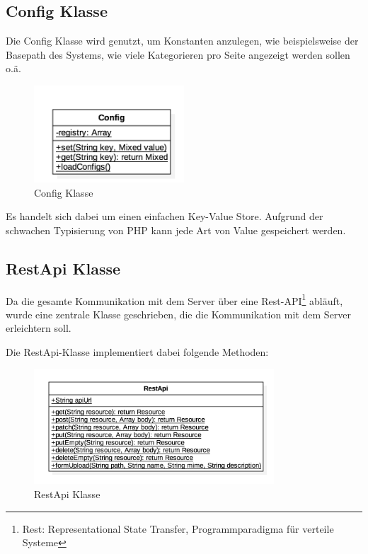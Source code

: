\subsection{Config Klasse}

Die Config Klasse wird genutzt, um Konstanten anzulegen, wie beispielsweise der Basepath des Systems, wie viele Kategorieren pro Seite angezeigt werden sollen o.ä.

\begin{figure}[h!]
		\centering
        \includegraphics[width=0.5\textwidth]{./Includes/Software/Config.png}
    \caption{Config Klasse}
\end{figure}

Es handelt sich dabei um einen einfachen Key-Value Store. Aufgrund der schwachen Typisierung von PHP kann jede Art von Value gespeichert werden.

\newpage

\subsection{RestApi Klasse}

Da die gesamte Kommunikation mit dem Server über eine Rest-API\footnote{Rest: Representational State Transfer, Programmparadigma für verteile Systeme} abläuft, wurde eine zentrale Klasse geschrieben, die die Kommunikation mit dem Server erleichtern soll.

\pm

Die RestApi-Klasse implementiert dabei folgende Methoden:

\begin{figure}[H]
		\centering
        \includegraphics[width=0.8\textwidth]{./Includes/Software/RestApi.png}
    \caption{RestApi Klasse}
\end{figure}

